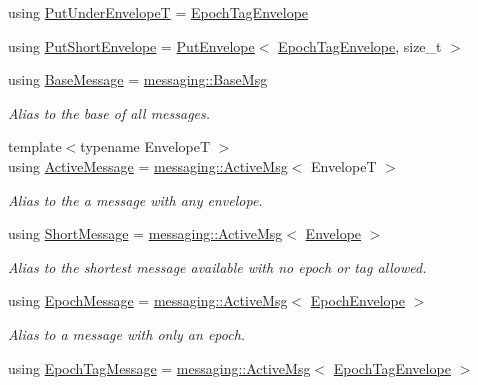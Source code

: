 \begin{DoxyCompactItemize}
\item 
using \hyperlink{namespacevt_a38f077afcffb8ed5e18c6760e6697bbc}{Put\+Under\+EnvelopeT} = \hyperlink{namespacevt_af23b58014ced6898422213a0e5e6a27a}{Epoch\+Tag\+Envelope}
\item 
using \hyperlink{namespacevt_a4e561211bbf1d8d9a4766eb159852736}{Put\+Short\+Envelope} = \hyperlink{structvt_1_1_put_envelope}{Put\+Envelope}$<$ \hyperlink{namespacevt_af23b58014ced6898422213a0e5e6a27a}{Epoch\+Tag\+Envelope}, size\+\_\+t $>$
\item 
using \hyperlink{namespacevt_ac34f95a5e2b8109b55bfba52b074443d}{Base\+Message} = \hyperlink{structvt_1_1messaging_1_1_base_msg}{messaging\+::\+Base\+Msg}
\begin{DoxyCompactList}\small\item\em Alias to the base of all messages. \end{DoxyCompactList}\item 
{\footnotesize template$<$typename EnvelopeT $>$ }\\using \hyperlink{namespacevt_a00eb67bd138395b6a4f744fab3fa0678}{Active\+Message} = \hyperlink{structvt_1_1messaging_1_1_active_msg}{messaging\+::\+Active\+Msg}$<$ EnvelopeT $>$
\begin{DoxyCompactList}\small\item\em Alias to the a message with any envelope. \end{DoxyCompactList}\item 
using \hyperlink{namespacevt_a1125ac1da6c0bbf141e0ea0739d7602d}{Short\+Message} = \hyperlink{structvt_1_1messaging_1_1_active_msg}{messaging\+::\+Active\+Msg}$<$ \hyperlink{namespacevt_aa9c8cc094b5361482021d63012987814}{Envelope} $>$
\begin{DoxyCompactList}\small\item\em Alias to the shortest message available with no epoch or tag allowed. \end{DoxyCompactList}\item 
using \hyperlink{namespacevt_ad67368ffae52d7325002586b41bb150e}{Epoch\+Message} = \hyperlink{structvt_1_1messaging_1_1_active_msg}{messaging\+::\+Active\+Msg}$<$ \hyperlink{namespacevt_af71a025689a3da5037785b53a7a8e78c}{Epoch\+Envelope} $>$
\begin{DoxyCompactList}\small\item\em Alias to a message with only an epoch. \end{DoxyCompactList}\item 
using \hyperlink{namespacevt_a4ccc13b06bff8a4a35426a1a082a95a9}{Epoch\+Tag\+Message} = \hyperlink{structvt_1_1messaging_1_1_active_msg}{messaging\+::\+Active\+Msg}$<$ \hyperlink{namespacevt_af23b58014ced6898422213a0e5e6a27a}{Epoch\+Tag\+Envelope} $>$

\end{DoxyCompactItemize}
